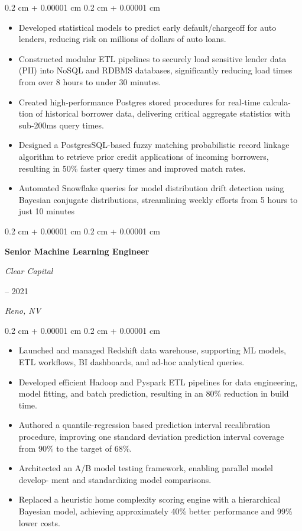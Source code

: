 \documentclass[11pt, letterpaper]{article}
\newenvironment{highlights}{
    \begin{itemize}[
        topsep=0.10 cm,
        parsep=0.10 cm,
        partopsep=0pt,
        itemsep=0pt,
        leftmargin=0.4 cm + 10pt
    ]
}{
    \end{itemize}
} %
\newenvironment{onecolentry}{
    \begin{adjustwidth}{
        0.2 cm + 0.00001 cm
    }{
        0.2 cm + 0.00001 cm
    }
}{
    \end{adjustwidth}
} %
\newenvironment{twocolentry}[2][]{
    \onecolentry
    \def\secondColumn{#2}
    \setcolumnwidth{\fill, 4.5 cm}
    \begin{paracol}{2}
}{
    \switchcolumn \raggedleft \secondColumn
    \end{paracol}
    \endonecolentry
} %
\begin{document}
\begin{onecolentry}
    \begin{highlights}
        \item Developed statistical models to predict early default/chargeoﬀ for auto lenders,
        reducing risk on millions of dollars of auto loans.
        \item Constructed modular ETL pipelines to securely load sensitive lender data (PII)
        into NoSQL and RDBMS databases, signiﬁcantly reducing load times from over 8
        hours to under 30 minutes.
        \item Created high-performance Postgres stored procedures for real-time calcula-
        tion of historical borrower data, delivering critical aggregate statistics with
        sub-200ms query times.
        \item Designed a PostgresSQL-based fuzzy matching probabilistic record linkage
        algorithm to retrieve prior credit applications of incoming borrowers, resulting
        in 50\% faster query times and improved match rates.
        \item Automated Snowﬂake queries for model distribution drift detection using Bayesian conjugate distributions,
        streamlining weekly eﬀorts from 5 hours to just 10 minutes
    \end{highlights}
\end{onecolentry}

\begin{twocolentry}{
        2020 – 2021

        \textit{Reno, NV}
    }
    \textbf{Senior Machine Learning Engineer}

    \textit{Clear Capital}
\end{twocolentry}

\begin{onecolentry}
    \begin{highlights}

        \item Launched and managed Redshift data warehouse, supporting ML models, ETL
        workﬂows, BI dashboards, and ad-hoc analytical queries.
        \item Developed eﬃcient Hadoop and Pyspark ETL pipelines for data engineering,
        model ﬁtting, and batch prediction, resulting in an 80\% reduction in build time.
        \item Authored a quantile-regression based prediction interval recalibration procedure, improving
        one standard deviation prediction interval coverage from 90\% to the target of 68\%.
        \item Architected an A/B model testing framework, enabling parallel model develop-
        ment and standardizing model comparisons.
        \item Replaced a heuristic home complexity scoring engine with a hierarchical Bayesian model,
        achieving approximately 40\% better performance and 99\% lower costs.

    \end{highlights}
\end{onecolentry}
\end{document}
